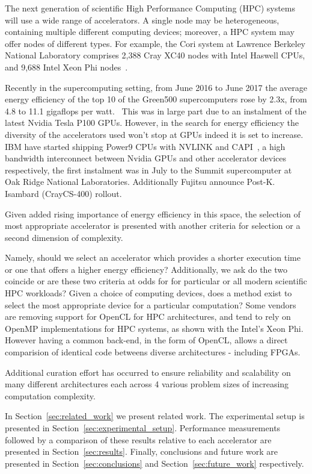 \documentclass[../document.tex]{subfiles}
\begin{document}
\label{sec:introduction}

The next generation of scientific High Performance Computing (HPC) systems will use a wide range of accelerators.
A single node may be heterogeneous, containing multiple different computing devices; moreover, a HPC system may offer nodes of different types.
For example, the Cori system at Lawrence Berkeley National Laboratory comprises 2,388 Cray XC40 nodes with Intel Haswell CPUs, and 9,688 Intel Xeon Phi nodes~\cite{declerck2016cori}.


Recently in the supercomputing setting, from June 2016 to June 2017 the average energy efficiency of the top 10 of the Green500 supercomputers rose by 2.3x, from 4.8 to 11.1 gigaflops per watt.~\cite{feldman_2017}
This was in large part due to an instalment of the latest Nvidia Tesla P100 GPUs.
However, in the search for energy efficiency the diversity of the accelerators used won't stop at GPUs indeed it is set to increase.
IBM have started shipping Power9 CPUs with NVLINK and CAPI~\cite{}, a high bandwidth interconnect between Nvidia GPUs and other accelerator devices respectively, the first instalment was in July to the Summit supercomputer at Oak Ridge National Laboratories.\cite{}
Additionally Fujitsu announce Post-K.
Isambard (CrayCS-400) rollout.

Given added rising importance of energy efficiency in this space, the selection of most appropriate accelerator is presented with another criteria for selection or a second dimension of complexity.

Namely, should we select an accelerator which provides a shorter execution time or one that offers a higher energy efficiency?
Additionally, we ask do the two coincide or are these two criteria at odds for for particular or all modern scientific HPC workloads?
Given a choice of computing devices, does a method exist to select the most appropriate device for a particular computation?
Some vendors are removing support for OpenCL for HPC architectures, and tend to rely on OpenMP implementations for HPC systems, as shown with the Intel's Xeon Phi.
However having a common back-end, in the form of OpenCL, allows a direct comparision of identical code betweens diverse architectures - including FPGAs.

Additional curation effort has occurred to ensure reliability and scalability on many different architectures each across 4 various problem sizes of increasing computation complexity.

In Section~\ref{sec:related_work} we present related work.
The experimental setup is presented in Section~\ref{sec:experimental_setup}.
Performance measurements followed by a comparison of these results relative to each accelerator are presented in Section~\ref{sec:results}.
Finally, conclusions and future work are presented in Section~\ref{sec:conclusions} and Section~\ref{sec:future_work} respectively.
\end{document}
